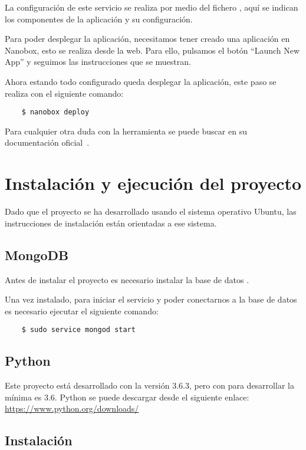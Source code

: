 La configuración de este servicio se realiza por medio del fichero 
, aquí se indican los componentes de la aplicación y su 
configuración.

Para poder desplegar la aplicación, necesitamos tener creado una aplicación en 
Nanobox, esto se realiza desde la web. Para ello, pulsamos el botón ``Launch 
New App'' y seguimos las instrucciones que se muestran.

Ahora estando todo configurado queda desplegar la aplicación, este paso se 
realiza con el siguiente comando:
\begin{lstlisting}
	$ nanobox deploy
\end{lstlisting}

Para cualquier otra duda con la herramienta se puede buscar en su documentación 
oficial~\cite{doc:nanobox}.

\section{Instalación y ejecución del proyecto}\label{sec:instalacion}

Dado que el proyecto se ha desarrollado usando el sistema operativo Ubuntu, las 
instrucciones de instalación están orientadas a ese sistema.

\subsection{MongoDB}

Antes de instalar el proyecto es necesario instalar la base de datos 
.

Una vez instalado, para iniciar el servicio y poder conectarnos a la base de 
datos es necesario ejecutar el siguiente comando:
\begin{lstlisting}
	$ sudo service mongod start
\end{lstlisting}

\subsection{Python}

Este proyecto está desarrollado con la versión 3.6.3, pero con para desarrollar 
la mínima es 3.6. Python se puede descargar desde el siguiente enlace: 
\url{https://www.python.org/downloads/}

\subsection{Instalación}

